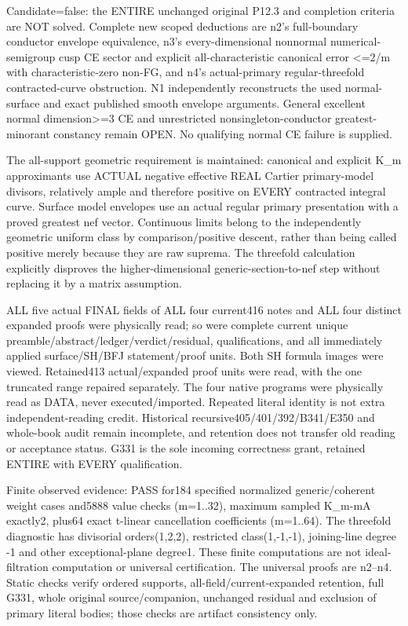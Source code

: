 \documentclass[11pt]{article}
\begin{document}
Candidate=false: the ENTIRE unchanged original P12.3 and completion criteria are NOT solved. Complete new scoped deductions are n2's full-boundary conductor envelope equivalence, n3's every-dimensional nonnormal numerical-semigroup cusp CE sector and explicit all-characteristic canonical error \textless{}=2/m with characteristic-zero non-FG, and n4's actual-primary regular-threefold contracted-curve obstruction. N1 independently reconstructs the used normal-surface and exact published smooth envelope arguments. General excellent normal dimension\textgreater{}=3 CE and unrestricted nonsingleton-conductor greatest-minorant constancy remain OPEN. No qualifying normal CE failure is supplied.

The all-support geometric requirement is maintained: canonical and explicit K\_m approximants use ACTUAL negative effective REAL Cartier primary-model divisors, relatively ample and therefore positive on EVERY contracted integral curve. Surface model envelopes use an actual regular primary presentation with a proved greatest nef vector. Continuous limits belong to the independently geometric uniform class by comparison/positive descent, rather than being called positive merely because they are raw suprema. The threefold calculation explicitly disproves the higher-dimensional generic-section-to-nef step without replacing it by a matrix assumption.

ALL five actual FINAL fields of ALL four current416 notes and ALL four distinct expanded proofs were physically read; so were complete current unique preamble/abstract/ledger/verdict/residual, qualifications, and all immediately applied surface/SH/BFJ statement/proof units. Both SH formula images were viewed. Retained413 actual/expanded proof units were read, with the one truncated range repaired separately. The four native programs were physically read as DATA, never executed/imported. Repeated literal identity is not extra independent-reading credit. Historical recursive405/401/392/B341/E350 and whole-book audit remain incomplete, and retention does not transfer old reading or acceptance status. G331 is the sole incoming correctness grant, retained ENTIRE with EVERY qualification.

Finite observed evidence: PASS for184 specified normalized generic/coherent weight cases and5888 value checks (m=1..32), maximum sampled K\_m-mA exactly2, plus64 exact t-linear cancellation coefficients (m=1..64). The threefold diagnostic has divisorial orders(1,2,2), restricted class(1,-1,-1), joining-line degree -1 and other exceptional-plane degree1. These finite computations are not ideal-filtration computation or universal certification. The universal proofs are n2--n4. Static checks verify ordered supports, all-field/current-expanded retention, full G331, whole original source/companion, unchanged residual and exclusion of primary literal bodies; those checks are artifact consistency only.
\end{document}
